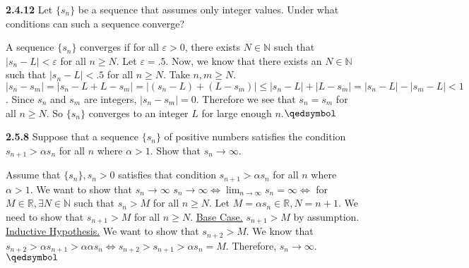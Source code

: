 \documentclass[12pt]{article}
\newcommand{\N}{\mathbb{N}}
\newcommand{\R}{\mathbb{R}}
\begin{document}
\begin{problem}\textbf{2.4.12}
Let $\{s_n\}$ be a sequence that assumes only integer values. Under what conditions can such a sequence converge?
\end{problem}
\begin{solution}\newline
A sequence $\{s_n\}$ converges if for all $\varepsilon>0$, there exists $N\in\N$ such that $|s_n-L|<\varepsilon$ for all $n\geq N$.\newline
Let $\varepsilon=.5$.\newline
Now, we know that there exists an $N\in\N$ such that $|s_n-L|<.5$ for all $n\geq N$.\newline
Take $n,m\geq N$.\newline
$|s_n-s_m|=|s_n-L+L-s_m|=|(s_n-L)+(L-s_m)|\leq |s_n-L|+|L-s_m|=|s_n-L|-|s_m-L|<1$.\newline
Since $s_n$ and $s_m$ are integers, $|s_n-s_m|=0$.\newline
Therefore we see that $s_n=s_m$ for all $n\geq N$.\newline
So $\{s_n\}$ converges to an integer $L$ for large enough $n$.\flushright$\qedsymbol$
\end{solution}
\newpage
\begin{problem}\textbf{2.5.8}
Suppose that a sequence $\{s_n\}$ of positive numbers satisfies the condition $s_{n+1}>\alpha s_n$ for all $n$ where $\alpha>1$. Show that $s_n\rightarrow\infty$.
\end{problem}
\begin{solution}\newline
Assume that $\{s_n\},s_n>0$ satisfies that condition $s_{n+1}>\alpha s_n$ for all $n$ where $\alpha>1$.\newline
We want to show that $s_n\rightarrow\infty$\newline
$s_n\rightarrow\infty\iff \displaystyle{\lim_{n \to \infty}s_n=\infty}\iff$ for $M\in \R,\exists N\in\N$ such that $s_n>M$ for all $n\geq N$.\newline
Let $M=\alpha s_n\in\R,N=n+1$.\newline
We need to show that $s_{n+1}>M$ for all $n\geq N$.\newline
\underline{Base Case.}\newline
$s_{n+1}>M$ by assumption.\newline
\underline{Inductive Hypothesis.}\newline
We want to show that $s_{n+2}>M$.\newline
We know that $s_{n+2}>\alpha s_{n+1}>\alpha\alpha s_n\iff s_{n+2}>s_{n+1}>\alpha s_n=M$.\newline
Therefore, $s_n\rightarrow\infty$.\flushright$\qedsymbol$


\end{solution}


\end{document}
